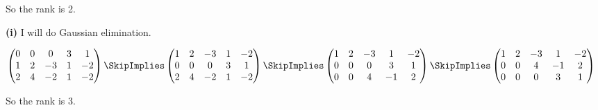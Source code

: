 \documentclass[oneside,12pt]{amsart}
\begin{document}
\bigskip

So the rank is 2.

\bigskip

\textbf{(i)} I will do Gaussian elimination.

\bigskip

$
\begin{pmatrix}
0 & 0 & 0 & 3 & 1 \\
1 & 2 & -3 & 1 & -2 \\
2 & 4 & -2 & 1 & -2
\end{pmatrix}
\SkipImplies
\begin{pmatrix}
1 & 2 & -3 & 1 & -2 \\
0 & 0 & 0 & 3 & 1 \\
2 & 4 & -2 & 1 & -2
\end{pmatrix}
\SkipImplies
\begin{pmatrix}
1 & 2 & -3 & 1 & -2 \\
0 & 0 & 0 & 3 & 1 \\
0 & 0 & 4 & -1 & 2
\end{pmatrix}
\SkipImplies
\begin{pmatrix}
1 & 2 & -3 & 1 & -2 \\
0 & 0 & 4 & -1 & 2 \\
0 & 0 & 0 & 3 & 1
\end{pmatrix}
$


\bigskip

So the rank is 3.
\end{document}
